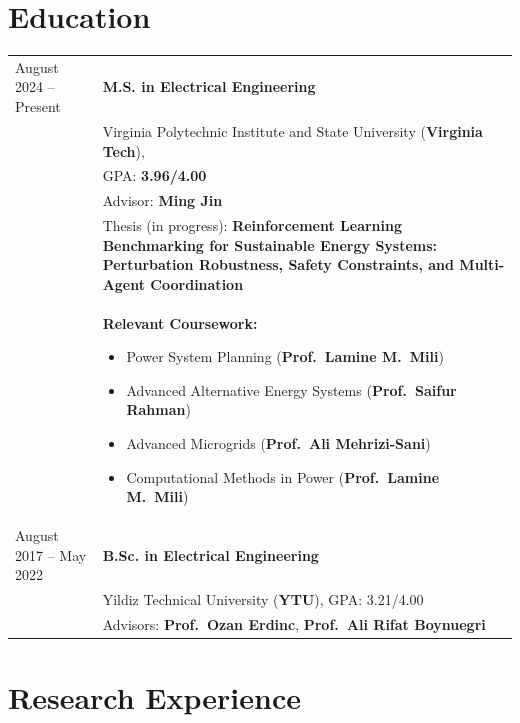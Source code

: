 \documentclass[a4paper,12pt]{article}
\begin{document}
\section{Education}
\begin{tabularx}{\linewidth}{@{}l X@{}}
August 2024 -- Present & 
\textbf{M.S. in Electrical Engineering} \\
& Virginia Polytechnic Institute and State University (\textbf{Virginia Tech}),\\
& GPA: \textbf{3.96/4.00} \\
& Advisor: \textbf{Ming Jin} \\
& Thesis (in progress): \textbf{Reinforcement Learning Benchmarking for Sustainable Energy Systems: Perturbation Robustness, Safety Constraints, and Multi-Agent Coordination} \\
& \textbf{Relevant Coursework:} 
\begin{itemize}[leftmargin=*]
  \item Power System Planning (\textbf{Prof.\ Lamine M.\ Mili})
  \item Advanced Alternative Energy Systems (\textbf{Prof.\ Saifur Rahman})
  \item Advanced Microgrids (\textbf{Prof.\ Ali Mehrizi-Sani})
  \item Computational Methods in Power (\textbf{Prof.\ Lamine M.\ Mili})
\end{itemize} \\[6pt]

August 2017 -- May 2022 & 
\textbf{B.Sc. in Electrical Engineering} \\
& Yildiz Technical University (\textbf{YTU}), GPA: 3.21/4.00 \\
& Advisors: \textbf{Prof.\ Ozan Erdinc}, \textbf{Prof.\ Ali Rifat Boynuegri} \\
\end{tabularx}



\section{Research Experience}
\end{document}
